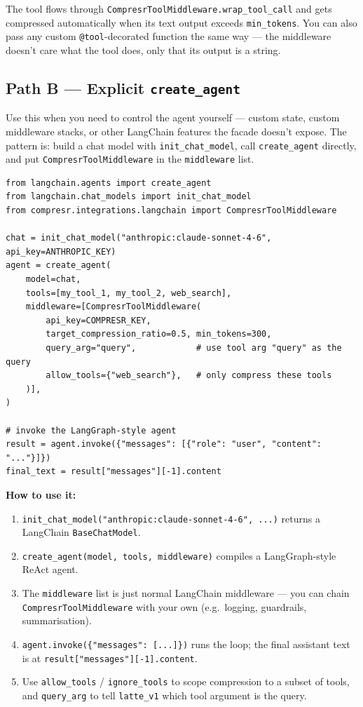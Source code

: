 \documentclass[10pt,a4paper]{article}
\begin{document}
\noindent The tool flows through \texttt{CompresrToolMiddleware.wrap\_tool\_call} and gets compressed automatically when its text output exceeds \texttt{min\_tokens}. You can also pass any custom \texttt{@tool}-decorated function the same way --- the middleware doesn't care what the tool does, only that its output is a string.

\subsection{Path B --- Explicit \texttt{create\_agent}}

Use this when you need to control the agent yourself --- custom state, custom middleware stacks, or other LangChain features the facade doesn't expose. The pattern is: build a chat model with \texttt{init\_chat\_model}, call \texttt{create\_agent} directly, and put \texttt{CompresrToolMiddleware} in the \texttt{middleware} list.

\begin{lstlisting}
from langchain.agents import create_agent
from langchain.chat_models import init_chat_model
from compresr.integrations.langchain import CompresrToolMiddleware

chat = init_chat_model("anthropic:claude-sonnet-4-6", api_key=ANTHROPIC_KEY)
agent = create_agent(
    model=chat,
    tools=[my_tool_1, my_tool_2, web_search],
    middleware=[CompresrToolMiddleware(
        api_key=COMPRESR_KEY,
        target_compression_ratio=0.5, min_tokens=300,
        query_arg="query",            # use tool arg "query" as the query
        allow_tools={"web_search"},   # only compress these tools
    )],
)

# invoke the LangGraph-style agent
result = agent.invoke({"messages": [{"role": "user", "content": "..."}]})
final_text = result["messages"][-1].content
\end{lstlisting}

\noindent\textbf{How to use it:}
\begin{enumerate}[leftmargin=*,itemsep=1pt]
  \item \texttt{init\_chat\_model("anthropic:claude-sonnet-4-6", ...)} returns a LangChain \texttt{BaseChatModel}.
  \item \texttt{create\_agent(model, tools, middleware)} compiles a LangGraph-style ReAct agent.
  \item The \texttt{middleware} list is just normal LangChain middleware --- you can chain \texttt{CompresrToolMiddleware} with your own (e.g.\ logging, guardrails, summarisation).
  \item \texttt{agent.invoke(\{"messages": [...]\})} runs the loop; the final assistant text is at \texttt{result["messages"][-1].content}.
  \item Use \texttt{allow\_tools} / \texttt{ignore\_tools} to scope compression to a subset of tools, and \texttt{query\_arg} to tell \texttt{latte\_v1} which tool argument is the query.
\end{enumerate}
\end{document}
